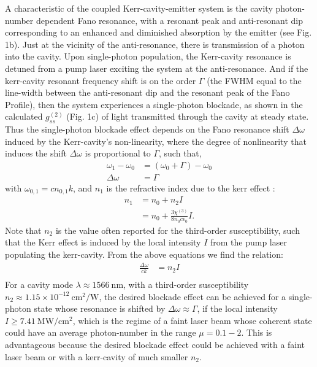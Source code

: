 \documentclass[12pt]{article}
\begin{document}
A characteristic of the coupled Kerr-cavity-emitter system is the cavity 
photon-number dependent Fano resonance, with a resonant peak and 
anti-resonant dip corresponding to an enhanced and diminished absorption by the
emitter (see Fig. 1b). Just at the vicinity of the  anti-resonance, there is 
transmission of a photon into the cavity. Upon single-photon population, the
Kerr-cavity resonance is detuned from a pump laser exciting the system at the
anti-resonance. And if the kerr-cavity resonant frequency shift is on the order 
$\Gamma$ (the FWHM equal to the line-width between the anti-resonant dip and 
the resonant peak of the Fano Profile), then the system experiences a 
single-photon blockade, as shown in the calculated $g^{(2)}_{ss}$ (Fig. 1c) 
of light transmitted through the cavity at steady state. Thus the single-photon 
blockade effect depends on the Fano resonance shift $\Delta\omega$ induced by the 
Kerr-cavity's non-linearity, where the degree of nonlinearity that induces the 
shift $\Delta\omega$ is proportional to $\Gamma$, such that,
\begin{equation}
\begin{split}
\omega_1 - \omega_0 &= (\omega_0 + \Gamma ) - \omega_0
\\
\Delta\omega &= \Gamma
\end{split}
\end{equation}
with $\omega_{0,1} = c n_{0,1} k$, and $n_1$ is the refractive index due
to the kerr effect \cite{spillane2002ultralow}:
\begin{equation}
\begin{split}
n_1 &= n_0 + n_2 I
\\
&= n_0 + \frac{3 \chi^{(3)}}{8 n_0 c\epsilon_0} I.
\end{split}
\end{equation}
Note that $n_2$ is the value often reported for the third-order susceptibility,
such that the Kerr effect is induced by the local intensity $I$ from the pump 
laser populating the kerr-cavity. From the above equations we find the relation:
\begin{equation}
\begin{split}
\frac{\Delta \omega}{ck} &= n_2 I \\
\end{split}
\end{equation}
For a cavity mode $\lambda \approx 1566 \:\mathrm{nm}$,
\cite{pan2019elucidating, heylman2013photothermal} with a third-order 
susceptibility $n_2 \approx 1.15 \times 10^{-12} \:\mathrm{cm}^2/\mathrm{W}$, 
\cite{qin2010design} the desired blockade effect can be achieved for a 
single-photon state whose resonance is shifted by $\Delta\omega \approx 
\Gamma$, if the local intensity $I \ge 7.41 \: \mathrm{MW}/\mathrm{cm^2}$, 
which is the regime of a faint laser beam whose coherent state could have an 
average photon-number in the range $\mu = 0.1-2$. \cite{al2008characterization}
This is advantageous because the desired blockade effect could be achieved with 
a faint laser beam or with a kerr-cavity of much smaller $n_2$.
\end{document}
